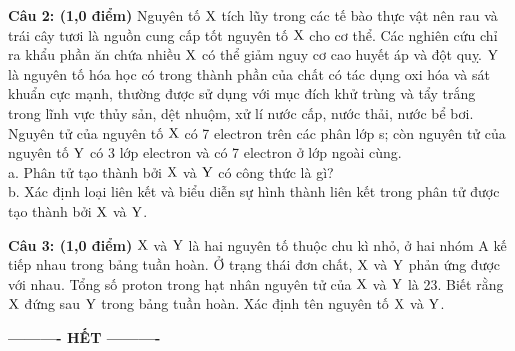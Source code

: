 \documentclass[11pt,a4paper]{article}
\begin{document}
\vspace{4pt}
\noindent
\textbf{Câu 2: (1,0 điểm)} Nguyên tố $\ce{X}$ tích lũy trong các tế bào thực vật nên rau và trái cây tươi là nguồn cung cấp tốt nguyên tố $\ce{X}$ cho cơ thể. Các nghiên cứu chỉ ra khẩu phần ăn chứa nhiều $\ce{X}$ có thể giảm nguy cơ cao huyết áp và đột quỵ. $\ce{Y}$ là nguyên tố hóa học có trong thành phần của chất có tác dụng oxi hóa và sát khuẩn cực mạnh, thường được sử dụng với mục đích khử trùng và tẩy trắng trong lĩnh vực thủy sản, dệt nhuộm, xử lí nước cấp, nước thải, nước bể bơi. Nguyên tử của nguyên tố $\ce{X}$ có 7 electron trên các phân lớp s; còn nguyên tử của nguyên tố $\ce{Y}$ có 3 lớp electron và có 7 electron ở lớp ngoài cùng.\\
a. Phân tử tạo thành bởi $\ce{X}$ và $\ce{Y}$ có công thức là gì?\\
b. Xác định loại liên kết và biểu diễn sự hình thành liên kết trong phân tử được tạo thành bởi $\ce{X}$ và $\ce{Y}$.

\vspace{1pt}
\noindent
{}

\vspace{4pt}
\noindent
\textbf{Câu 3: (1,0 điểm)} $\ce{X}$ và $\ce{Y}$ là hai nguyên tố thuộc chu kì nhỏ, ở hai nhóm A kế tiếp nhau trong bảng tuần hoàn. Ở trạng thái đơn chất, $\ce{X}$ và $\ce{Y}$ phản ứng được với nhau. Tổng số proton trong hạt nhân nguyên tử của $\ce{X}$ và $\ce{Y}$ là 23. Biết rằng $\ce{X}$ đứng sau $\ce{Y}$ trong bảng tuần hoàn. Xác định tên nguyên tố $\ce{X}$ và $\ce{Y}$.

\vspace{1pt}
\noindent
{}

\vspace{6pt}
\begin{center}
\textbf{\large ---------- HẾT ----------}
\end{center}
\end{document}
